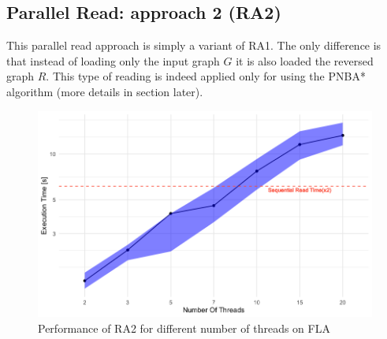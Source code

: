 \documentclass[twocolumn, switch]{article} %
\begin{document}
\subsection{Parallel Read: approach 2 (RA2)}
This parallel read approach is simply a variant of RA1. The only difference is that
instead of loading only the input graph $G$ it is also loaded the reversed graph $R$. This type of
reading is indeed applied only for using the PNBA* algorithm (more details in section later).
\begin{figure}[ht!]
  \centering
  \includegraphics[width=1\linewidth]{read/par_read_2_time.png}
  \caption{Performance of RA2 for different number of threads on FLA}
  \label{parread2time}
\end{figure}
\end{document}
